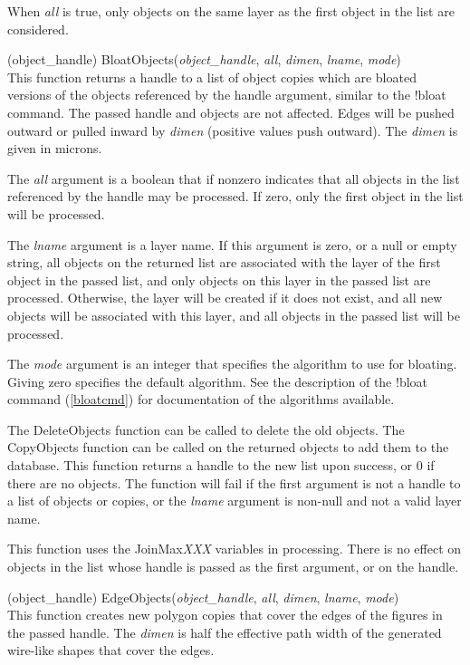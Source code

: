 \begin{description}
When {\it all} is true, only objects on the same layer as the first
object in the list are considered.

\item{(object\_handle) \vt BloatObjects({\it object\_handle}, {\it all\/},
 {\it dimen\/}, {\it lname\/}, {\it mode\/})}\\
This function returns a handle to a list of object copies which are
bloated versions of the objects referenced by the handle argument,
similar to the {\cb !bloat} command.  The passed handle and objects
are not affected.  Edges will be pushed outward or pulled inward by
{\it dimen} (positive values push outward).  The {\it dimen} is given
in microns.

The {\it all} argument is a boolean that if nonzero indicates that all
objects in the list referenced by the handle may be processed.  If
zero, only the first object in the list will be processed.

The {\it lname} argument is a layer name.  If this argument is zero,
or a null or empty string, all objects on the returned list are
associated with the layer of the first object in the passed list, and
only objects on this layer in the passed list are processed. 
Otherwise, the layer will be created if it does not exist, and all new
objects will be associated with this layer, and all objects in the
passed list will be processed.

The {\it mode} argument is an integer that specifies the algorithm to
use for bloating.  Giving zero specifies the default algorithm.  See
the description of the {\cb !bloat} command (\ref{bloatcmd}) for
documentation of the algorithms available. 

The {\vt DeleteObjects} function can be called to delete the old
objects.  The {\vt CopyObjects} function can be called on the returned
objects to add them to the database.  This function returns a handle
to the new list upon success, or 0 if there are no objects.  The
function will fail if the first argument is not a handle to a list of
objects or copies, or the {\it lname} argument is non-null and not a
valid layer name.

This function uses the {\et JoinMax}{\it XXX} variables in processing. 
There is no effect on objects in the list whose handle is passed as
the first argument, or on the handle.

\item{(object\_handle) \vt EdgeObjects({\it object\_handle}, {\it all\/},
 {\it dimen\/}, {\it lname\/}, {\it mode\/})}\\
This function creates new polygon copies that cover the edges of the
figures in the passed handle.  The {\it dimen} is half the effective
path width of the generated wire-like shapes that cover the edges.


\end{description}
